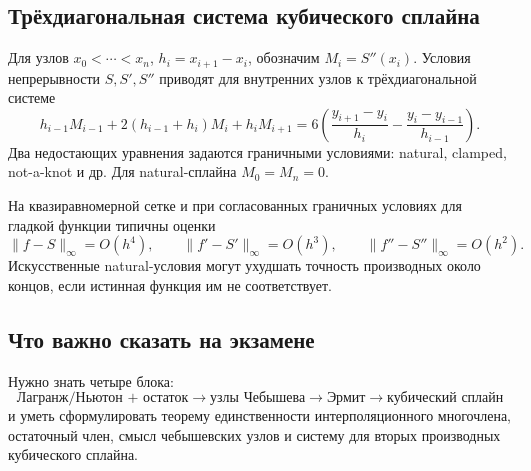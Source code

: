 \subsection{Трёхдиагональная система кубического сплайна}

Для узлов $x_0<\cdots<x_n$, $h_i=x_{i+1}-x_i$, обозначим
$M_i=S''(x_i)$. Условия непрерывности $S,S',S''$ приводят для внутренних узлов к
трёхдиагональной системе
\[
h_{i-1}M_{i-1}+2(h_{i-1}+h_i)M_i+h_iM_{i+1}
=6\left(
\frac{y_{i+1}-y_i}{h_i}-
\frac{y_i-y_{i-1}}{h_{i-1}}
\right).
\]
Два недостающих уравнения задаются граничными условиями: natural,
clamped, not-a-knot и др. Для natural-сплайна $M_0=M_n=0$.

На квазиравномерной сетке и при согласованных граничных условиях для гладкой
функции типичны оценки
\[
\|f-S\|_\infty=O(h^4),\qquad
\|f'-S'\|_\infty=O(h^3),\qquad
\|f''-S''\|_\infty=O(h^2).
\]
Искусственные natural-условия могут ухудшать точность производных около концов,
если истинная функция им не соответствует.


\subsection{Что важно сказать на экзамене}

Нужно знать четыре блока:
\[
\boxed{
\text{Лагранж/Ньютон + остаток}
\rightarrow
\text{узлы Чебышева}
\rightarrow
\text{Эрмит}
\rightarrow
\text{кубический сплайн}}
\]
и уметь сформулировать теорему единственности интерполяционного многочлена, остаточный член, смысл чебышевских узлов и систему для вторых производных кубического сплайна.

\newpage
